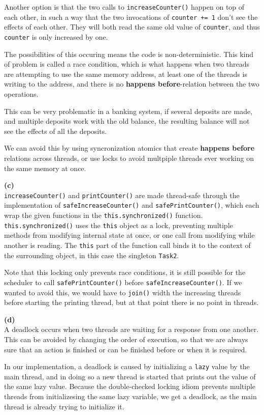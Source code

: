 \documentclass[12pt]{article}
\newcommand{\subtask}[1]{\hspace*{-1cm}\textbf{(#1)}\\[-5mm]}
\begin{document}
Another option is that the two calls to \verb|increaseCounter()| happen on top of each other,
in such a way that the two invocations of \verb|counter += 1| don't see the effects of each other.
They will both read the same old value of \verb|counter|, and thus \verb|counter| is only increased by one.

The possibilities of this occuring means the code is non-deterministic.
This kind of problem is called a race condition, which is what happens when
two threads are attempting to use the same memory address,
at least one of the threads is writing to the address,
and there is no \textbf{happens before}-relation between the two operations.

This can be very problematic in a banking system, if several deposits are made,
and multiple deposits work with the old balance, the resulting balance will not
see the effects of all the deposits.

We can avoid this by using syncronization atomics that create \textbf{happens before}
relations across threads, or use locks to avoid multpiple threads ever working on the same memory at once.

\subtask{c}
\verb|increaseCounter()| and \verb|printCounter()| are made thread-safe through the implementation of \verb|safeIncreaseCounter()| and \verb|safePrintCounter()|, which each wrap the given functions in the \verb|this.synchronized()| function. \verb|this.synchronized()| uses the \verb|this| object as a lock, preventing multiple methods from modifying internal state at once,
or one call from modifying while another is reading.
The \verb|this| part of the function call binds it to the context of the surrounding object, in this case the singleton \verb|Task2|.

Note that this locking only prevents race conditions, it is still possible for the scheduler to call \verb|safePrintCounter()| before \verb|safeIncreaseCounter()|.
If we wanted to avoid this, we would have to \verb|join()| width the increasing threads before starting the printing thread, but at that point there is no point in threads.

\subtask{d}
A deadlock occurs when two threads are waiting for a response from one another.
This can be avoided by changing the order of execution, so that we are always sure that an action is finished or can be finished before or when it is required.

In our implementation, a deadlock is caused by initializing a \verb|lazy| value by the main thread, and in doing so a new thread is started that prints out the value of the same lazy value. Because the double-checked locking idiom prevents multiple threads from initializesing the same lazy variable, we get a deadlock, as the main thread is already trying to initialize it.
\end{document}
